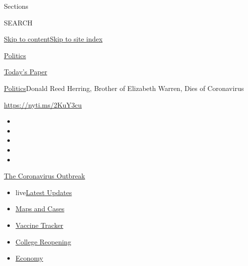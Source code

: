 Sections

SEARCH

\protect\hyperlink{site-content}{Skip to
content}\protect\hyperlink{site-index}{Skip to site index}

\href{https://www.nytimes3xbfgragh.onion/section/politics}{Politics}

\href{https://myaccount.nytimes3xbfgragh.onion/auth/login?response_type=cookie\&client_id=vi}{}

\href{https://www.nytimes3xbfgragh.onion/section/todayspaper}{Today's
Paper}

\href{/section/politics}{Politics}\textbar{}Donald Reed Herring, Brother
of Elizabeth Warren, Dies of Coronavirus

\url{https://nyti.ms/2KuY3cu}

\begin{itemize}
\item
\item
\item
\item
\item
\end{itemize}

\href{https://www.nytimes3xbfgragh.onion/news-event/coronavirus?action=click\&pgtype=Article\&state=default\&region=TOP_BANNER\&context=storylines_menu}{The
Coronavirus Outbreak}

\begin{itemize}
\tightlist
\item
  live\href{https://www.nytimes3xbfgragh.onion/2020/08/04/world/coronavirus-covid-19.html?action=click\&pgtype=Article\&state=default\&region=TOP_BANNER\&context=storylines_menu}{Latest
  Updates}
\item
  \href{https://www.nytimes3xbfgragh.onion/interactive/2020/us/coronavirus-us-cases.html?action=click\&pgtype=Article\&state=default\&region=TOP_BANNER\&context=storylines_menu}{Maps
  and Cases}
\item
  \href{https://www.nytimes3xbfgragh.onion/interactive/2020/science/coronavirus-vaccine-tracker.html?action=click\&pgtype=Article\&state=default\&region=TOP_BANNER\&context=storylines_menu}{Vaccine
  Tracker}
\item
  \href{https://www.nytimes3xbfgragh.onion/2020/08/02/us/covid-college-reopening.html?action=click\&pgtype=Article\&state=default\&region=TOP_BANNER\&context=storylines_menu}{College
  Reopening}
\item
  \href{https://www.nytimes3xbfgragh.onion/live/2020/08/03/business/stock-market-today-coronavirus?action=click\&pgtype=Article\&state=default\&region=TOP_BANNER\&context=storylines_menu}{Economy}
\end{itemize}

